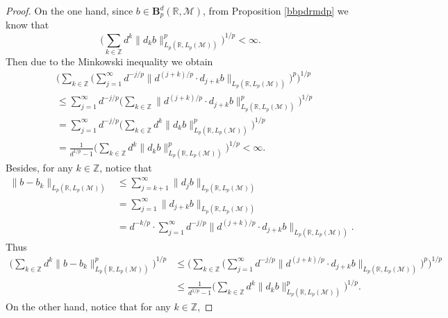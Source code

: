 \documentclass[oneside,english,a4wide]{amsart}
\numberwithin{equation}{section}
\numberwithin{figure}{section}
\theoremstyle{plain}
\theoremstyle{plain}
\theoremstyle{definition}
\theoremstyle{plain}
\theoremstyle{remark}
\theoremstyle{definition}
\theoremstyle{remark}
\theoremstyle{definition}
\newcommand{\8}{\infty}
\begin{document}
\begin{proof}
	On the one hand, since $b\in \pmb{B}_p^{d}(\mathbb{R},\mathcal{M})$, from Proposition \ref{bbpdrmdp} we know that
	$$\biggl(\sum_{k\in\mathbb{Z}} d^{k}\|d_kb\|_{L_p(\mathbb{R},L_p({\mathcal{M}}))}^p\biggr)^{1/p}<\infty.$$
	Then due to the Minkowski inequality we obtain
	\begin{equation*}
		\begin{aligned}
			{}&\biggl(\sum_{k\in\mathbb{Z}}  \Big(\sum_{j=1}^\infty d^{-j/p}\big\| d^{(j+k)/p}\cdot d_{j+k}b\big\|_{L_p(\mathbb{R},L_p(\mathcal{M}))}\Big)^p\biggr)^{1/p}\\
			&\le \sum_{j=1}^\infty  d^{-j/p} \biggl(\sum_{k\in\mathbb{Z}} \big\| d^{(j+k)/p}\cdot d_{j+k}b\big\|^p_{L_p(\mathbb{R},L_p(\mathcal{M}))}\biggr)^{1/p}\\
			&=\sum_{j=1}^\infty  d^{-j/p} \biggl(\sum_{k\in\mathbb{Z}} d^k \|d_{k}b\|^p_{L_p(\mathbb{R},L_p(\mathcal{M}))}\biggr)^{1/p}\\
			&=\frac{1}{d^{1/p}-1}\biggl(\sum_{k\in\mathbb{Z}} d^k \|d_{k}b\|^p_{L_p(\mathbb{R},L_p(\mathcal{M}))}\biggr)^{1/p}<\infty.
		\end{aligned}
	\end{equation*}
	Besides, for any $k\in\mathbb{Z}$, notice that
	\begin{equation*}
		\begin{aligned}
			\|b-b_k\|_{L_p(\mathbb{R},L_p(\mathcal{M}))}{}&\le  \sum_{j=k+1}^\infty \| d_jb\|_{L_p(\mathbb{R},L_p(\mathcal{M}))}\\
			&=\sum_{j=1}^\infty\| d_{j+k}b\|_{L_p(\mathbb{R},L_p(\mathcal{M}))}\\
			&=d^{-k/p}\cdot\sum_{j=1}^\infty d^{-j/p} \big\| d^{(j+k)/p}\cdot d_{j+k}b\big\|_{L_p(\mathbb{R},L_p(\mathcal{M}))}.
		\end{aligned}
	\end{equation*}
	Thus 
	\begin{equation*}
		\begin{aligned}
			\biggl(\sum_{k\in\mathbb{Z}} d^k \|b-b_k\|^p_{L_p(\mathbb{R},L_p(\mathcal{M}))}\biggr)^{1/p}{}&\le \biggl(\sum_{k\in\mathbb{Z}}  \Big(\sum_{j=1}^\infty d^{-j/p}\big\| d^{(j+k)/p}\cdot d_{j+k}b\big\|_{L_p(\mathbb{R},L_p(\mathcal{M}))}\Big)^p\biggr)^{1/p}\\
			&\le \frac{1}{d^{1/p}-1}\biggl(\sum_{k\in\mathbb{Z}} d^k \|d_{k}b\|^p_{L_p(\mathbb{R},L_p(\mathcal{M}))}\biggr)^{1/p}.
		\end{aligned}
	\end{equation*}
	On the other hand, notice that for any $k\in\mathbb{Z}$,

\end{proof}
\end{document}
